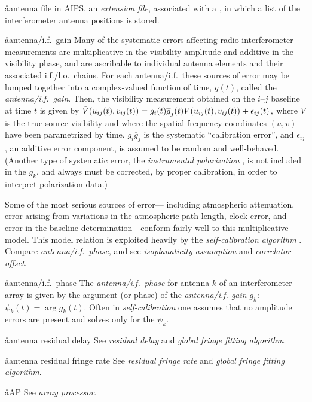 \aa{antenna file}
in AIPS, an {\it extension file}, associated with a ,
in which a list of the interferometer antenna positions is stored.

\aa{antenna/i.f.\ gain}
Many of the systematic errors affecting radio interferometer measurements
are multiplicative in the visibility amplitude and
additive in the visibility phase,
and are ascribable to individual antenna elements and their
associated i.f./l.o.\ chains.
For each antenna/i.f.\
these sources of error may be lumped together into a
complex-valued function of time, $g(t)$, called the
{\it antenna/i.f.\ gain}.
Then, the visibility measurement obtained on the $i$--$j$
baseline at time $t$ is given by
$\tilde V(u_{ij}(t),v_{ij}(t))=g_i(t)\overline g_j(t)V(u_{ij}(t),v_{ij}(t))
+\epsilon_{ij}(t)\,,$
where $V$ is the true source visibility and where the spatial
frequency coordinates $(u,v)$ have been parametrized by time.
$g_i\overline g_j$ is the systematic ``calibration error'',
and $\epsilon_{ij}$, an additive error component, is
assumed to be random and well-behaved.
(Another type of systematic error, the {\it instrumental
polarization} \qv, is not included in the $g_k$,
and always must be corrected, by proper calibration,
in order to interpret polarization data.)
\par
Some of the most serious sources of error---%
including atmospheric attenuation, error arising from variations
in the atmospheric path length,
clock error, and error in the baseline
determination---conform fairly well to this multiplicative model.
This model relation is exploited heavily
by the {\it self-calibration algorithm} \qv.
Compare {\it antenna/i.f.\ phase},
and see {\it isoplanaticity assumption} and {\it correlator offset}.

\aa{antenna/i.f.\ phase}
The {\it antenna/i.f.\ phase} for antenna $k$ of an
interferometer array is given by the argument (or phase)
of the {\it antenna/i.f. gain} $g_k$: $\psi_k(t)=\arg g_k(t)$.
Often in {\it self-calibration} one assumes that no amplitude
errors are present and solves only for the $\psi_k$.

\aa{antenna residual delay}
See {\it residual delay} and {\it global fringe fitting algorithm}.

\aa{antenna residual fringe rate}
See {\it residual fringe rate} and {\it global fringe fitting algorithm}.

\aa{AP} See {\it array processor}.

